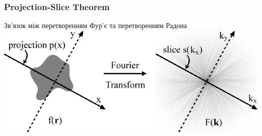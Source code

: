 \documentclass[12pt]{beamer}
\begin{document}
\begin{frame}\frametitle{Projection-Slice Theorem }
	Зв'язок між перетворенням Фур'є та перетворенням Радона \linebreak
	\includegraphics[scale=0.4]{images/projection_slice} 
\end{frame}
\end{document}

